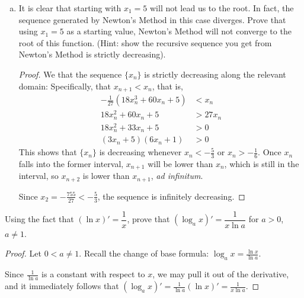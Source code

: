 \begin{enumerate}[(a)]
\begin{proof}[Solution]
\begin{alignat*}{4}
             & x_2 &  & = -\frac{1}{27}(18(5)^2+60(5)+5)                                         &  & = -\frac{755}{27}                 &  & \cong -27.96296     \\
             & x_3 &  & = -\frac{1}{27}(18(-755/27)^2+60(-755/27)+5)                             &  & = -\frac{1004555}{2187}           &  & \cong -459.33013    \\
             & x_3 &  & = -\frac{1}{27}(18(-\frac{1004555}{2187})^2+60(-\frac{1004555}{2187})+5) &  & = -\frac{2003617741355}{14348907} &  & \cong -139635.56537
          \end{alignat*}
          This is\dots not converging.
        \end{proof}
  \item It is clear that starting with $x_1=5$ will not lead us to the root.
        In fact, the sequence generated by Newton's Method in this case diverges.
        Prove that using $x_1=5$ as a starting value,
        Newton's Method will not converge to the root of this function.
        (Hint: show the recursive sequence you get from Newton's Method is strictly decreasing).
        \begin{proof}
          We that the sequence $\{x_n\}$ is strictly decreasing along the relevant domain:
          Specifically, that $x_{n+1} < x_n$, that is,
          \begin{align*}
            -\frac{1}{27}(18x_n^3 + 60x_n + 5) & < x_n   \\
            18x_n^2 + 60x_n + 5                & > 27x_n \\
            18x_n^2 + 33x_n + 5                & > 0     \\
            (3x_n+5)(6x_n+1)                   & > 0
          \end{align*}
          This shows that $\{x_n\}$ is decreasing whenever $x_n < -\frac53$ or $x_n > -\frac16$.
          Once $x_n$ falls into the former interval, $x_{n+1}$ will be lower than $x_n$,
          which is still in the interval, so $x_{n+2}$ is lower than $x_{n+1}$, \emph{ad infinitum}.

          Since $x_2=-\frac{755}{27} < -\frac{5}{3}$, the sequence is infinitely decreasing.
        \end{proof}
\end{enumerate}


\question Using the fact that $(\ln x)' = \dfrac{1}{x}$,
prove that $(\log_a x)'=\dfrac{1}{x\ln a}$ for $a > 0$, $a \neq 1$.
\begin{proof}
  Let $0 < a \neq 1$.
  Recall the change of base formula: $\log_a x = \frac{\ln x}{\ln a}$.

  Since $\frac{1}{\ln a}$ is a constant with respect to $x$, we may pull it out of the derivative,
  and it immediately follows that $(\log_a x)' = \frac{1}{\ln a}(\ln x)' = \frac{1}{x\ln a}$.
\end{proof}


